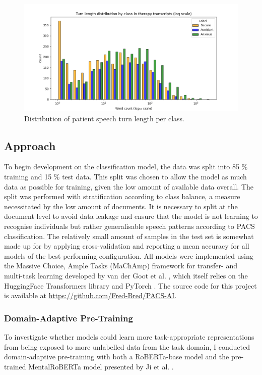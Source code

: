 \documentclass[12pt]{report}
\begin{document}
\begin{figure}
    \includegraphics[width=\textwidth]{figures/log_dodge_turn_length_distribution_by_class.png}
    \caption{Distribution of patient speech turn length per class.}
    \label{fig: class balance turn len}
\end{figure}

\subsection{Approach}
To begin development on the classification model, the data was split into 85 \% training and 15 \% test data.
This split was chosen to allow the model as much data as possible for training, given the low amount of available data overall.
The split was performed with stratification according to class balance, a measure necessitated by the low amount of documents.
It is necessary to split at the document level to avoid data leakage and ensure that the model is not learning to recognise individuals but rather generalisable speech patterns according to PACS classification.
The relatively small amount of samples in the test set is somewhat made up for by applying cross-validation and reporting a mean accuracy for all models of the best performing configuration.
All models were implemented using the Massive Choice, Ample Tasks (MaChAmp) framework for transfer- and multi-task learning developed by van der Goot et al. \citeyear{MaChAmp}, which itself relies on the HuggingFace Transformers library \cite{HuggingFace} and PyTorch \cite{PyTorch}.
The source code for this project is available at \url{https://github.com/Fred-Bred/PACS-AI}.

\subsubsection{Domain-Adaptive Pre-Training}
To investigate whether models could learn more task-appropriate representations from being exposed to more unlabelled data from the task domain, I conducted domain-adaptive pre-training with both a RoBERTa-base model \cite{roberta} and the pre-trained MentalRoBERTa model presented by Ji et al. \citeyear{MentalBERT}.
\end{document}
